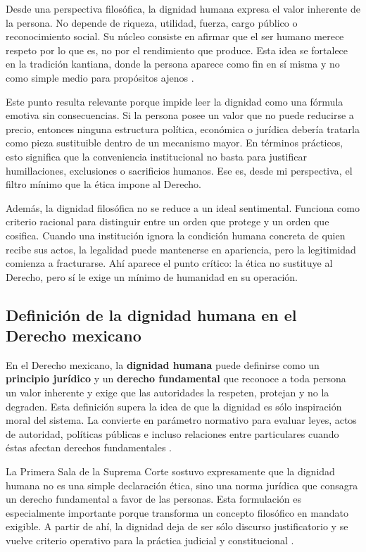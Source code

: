 \documentclass[
	spanish,
	letterpaper, oneside
]{article}
\begin{document}
Desde una perspectiva filosófica, la dignidad humana expresa el valor inherente de la persona. No depende de riqueza, utilidad, fuerza, cargo público o reconocimiento social. Su núcleo consiste en afirmar que el ser humano merece respeto por lo que es, no por el rendimiento que produce. Esta idea se fortalece en la tradición kantiana, donde la persona aparece como fin en sí misma y no como simple medio para propósitos ajenos \citep{garciaMaynezEtica,huertaEticaConClasicos2000}.

Este punto resulta relevante porque impide leer la dignidad como una fórmula emotiva sin consecuencias. Si la persona posee un valor que no puede reducirse a precio, entonces ninguna estructura política, económica o jurídica debería tratarla como pieza sustituible dentro de un mecanismo mayor. En términos prácticos, esto significa que la conveniencia institucional no basta para justificar humillaciones, exclusiones o sacrificios humanos. Ese es, desde mi perspectiva, el filtro mínimo que la ética impone al Derecho.

Además, la dignidad filosófica no se reduce a un ideal sentimental. Funciona como criterio racional para distinguir entre un orden que protege y un orden que cosifica. Cuando una institución ignora la condición humana concreta de quien recibe sus actos, la legalidad puede mantenerse en apariencia, pero la legitimidad comienza a fracturarse. Ahí aparece el punto crítico: la ética no sustituye al Derecho, pero sí le exige un mínimo de humanidad en su operación.
\subsection{Definición de la dignidad humana en el Derecho mexicano}

En el Derecho mexicano, la \textbf{dignidad humana} puede definirse como un \textbf{principio jurídico} y un \textbf{derecho fundamental} que reconoce a toda persona un valor inherente y exige que las autoridades la respeten, protejan y no la degraden. Esta definición supera la idea de que la dignidad es sólo inspiración moral del sistema. La convierte en parámetro normativo para evaluar leyes, actos de autoridad, políticas públicas e incluso relaciones entre particulares cuando éstas afectan derechos fundamentales \citep{constitucionCPEUM2026,scjnJur37_2016}.

La Primera Sala de la Suprema Corte sostuvo expresamente que la dignidad humana no es una simple declaración ética, sino una norma jurídica que consagra un derecho fundamental a favor de las personas. Esta formulación es especialmente importante porque transforma un concepto filosófico en mandato exigible. A partir de ahí, la dignidad deja de ser sólo discurso justificatorio y se vuelve criterio operativo para la práctica judicial y constitucional \citep{scjnTesis2007731,scjnJur37_2016}.
\end{document}
